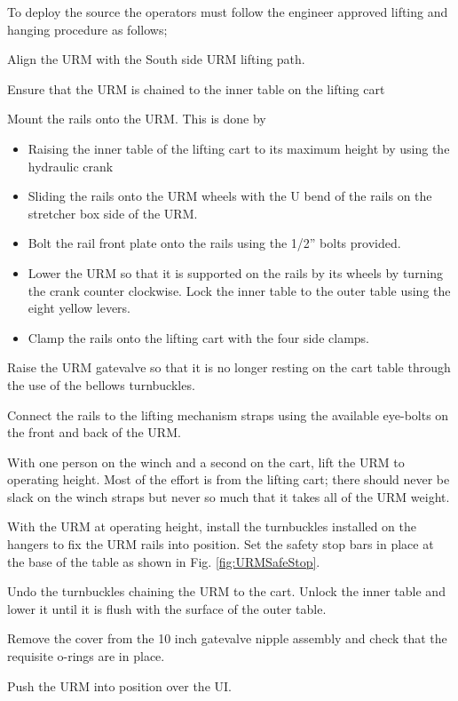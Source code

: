 \documentclass[11pt]{article}
\begin{document}
To deploy the source the operators must follow the engineer approved lifting and hanging procedure as follows;
\begin{answerlist}
\item Align the URM with the South side URM lifting path.
\item Ensure that the URM is chained to the inner table on the lifting cart
\item Mount the rails onto the URM. This is done by
  \begin{itemize}[label={$\square$}]
  \item Raising the inner table of the lifting cart to its maximum height by using the hydraulic crank
  \item Sliding the rails onto the URM wheels with the U bend of the rails on the stretcher box side of the URM.
  \item Bolt the rail front plate onto the rails using the 1/2'' bolts provided.
  \item Lower the URM so that it is supported on the rails by its wheels by turning the crank counter clockwise. Lock the inner table to the outer table using the eight yellow levers.
  \item Clamp the rails onto the lifting cart with the four side clamps.
  \end{itemize}
\item Raise the URM gatevalve so that it is no longer resting on the cart table through the use of the bellows turnbuckles. 
\item Connect the rails to the lifting mechanism straps using the available eye-bolts on the front and back of the URM.
\item With one person on the winch and a second on the cart, lift the URM to operating height. Most of the effort is from the lifting cart; there should never be slack on the winch straps but never so much that it takes all of the URM weight.
\item With the URM at operating height, install the turnbuckles installed on the hangers to fix the URM rails into position. Set the safety stop bars in place at the base of the table as shown in Fig. \ref{fig:URMSafeStop}.
\item Undo the turnbuckles chaining the URM to the cart. Unlock the inner table and lower it until it is flush with the surface of the outer table.
\item Remove the cover from the 10 inch gatevalve nipple assembly and check that the requisite o-rings are in place.
\item Push the URM into position over the UI.

\end{answerlist}
\end{document}
